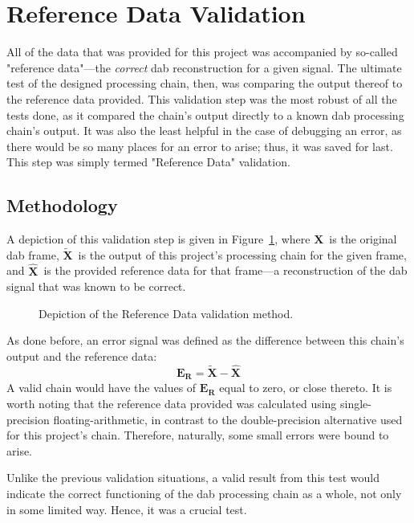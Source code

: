 \documentclass[class=report,11pt,crop=false]{standalone}
\begin{document}
\section{Reference Data Validation}
All of the data that was provided for this project was accompanied by so-called "reference data"---the \emph{correct} \gls{dab} reconstruction for a given signal. The ultimate test of the designed processing chain, then, was comparing the output thereof to the reference data provided. This validation step was the most robust of all the tests done, as it compared the chain's output directly to a known \gls{dab} processing chain's output. It was also the least helpful in the case of debugging an error, as there would be so many places for an error to arise; thus, it was saved for last.  This step was simply termed "Reference Data" validation.

\subsection{Methodology}
A depiction of this validation step is given in Figure~\ref{fig:reference-data-validation}, where \(\mathbf{X}\)~is the original \gls{dab} frame, \(\mathbf{\tilde{X}}\)~is the output of this project's processing chain for the given frame, and \(\mathbf{\hat{X}}\)~is the provided reference data for that frame---a reconstruction of the \gls{dab} signal that was known to be correct.
\begin{figure}[htbp]
  \centering
  \captionsetup{type=figure}
  \def\svgwidth{\linewidth}
  { %
      }
  \caption{Depiction of the Reference Data validation method.}
  \label{fig:reference-data-validation}
\end{figure}
As done before, an error signal was defined as the difference between this chain's output and the reference data:
\begin{equation}
  \mathbf{E_R} = \mathbf{\tilde{X}} - \mathbf{\hat{X}}
\end{equation}
A valid chain would have the values of \(\mathbf{E_R}\) equal to zero, or close thereto. It is worth noting that the reference data provided was calculated using single-precision floating-arithmetic, in contrast to the double-precision alternative used for this project's chain. Therefore, naturally, some small errors were bound to arise.

Unlike the previous validation situations, a valid result from this test would indicate the correct functioning of the \gls{dab} processing chain as a whole, not only in some limited way. Hence, it was a crucial test.
\end{document}
